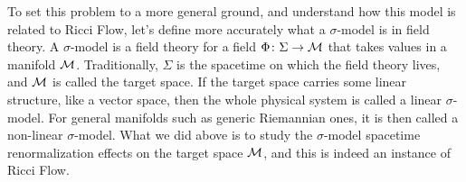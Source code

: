 To set this problem to a more general ground, and understand how this model is related to Ricci Flow, let's define more accurately what a $\sigma$-model is in field theory. A $\sigma$-model is a field theory for a field $\Phi \colon \Sigma \to \mathcal{M}$ that takes values in a manifold $\mathcal{M}$. Traditionally, $\Sigma$ is the spacetime on which the field theory lives, and $\mathcal{M}$ is called the target space. If the target space carries some linear structure, like a vector space, then the whole physical system is called a linear $\sigma$-model. For general manifolds such as generic Riemannian ones, it is then called a non-linear $\sigma$-model. What we did above is to study the $\sigma$-model spacetime renormalization effects on the target space $\mathcal{M}$, and this is indeed an instance of Ricci Flow.
